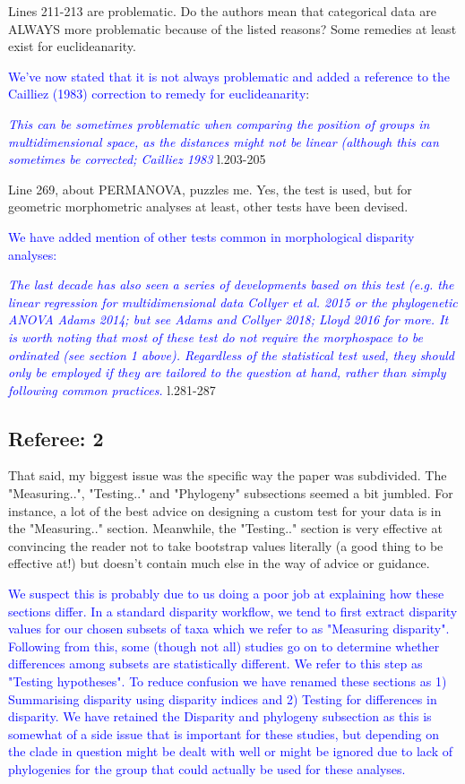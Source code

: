 \documentclass[12pt,letterpaper]{article}
\begin{document}
\noindent Lines 211-213 are problematic. Do the authors mean that categorical data are ALWAYS more problematic because of the listed reasons? Some remedies at least exist for euclideanarity.

\textcolor{blue}{We've now stated that it is not always problematic and added a reference to the Cailliez (1983) correction to remedy for euclideanarity}:

\textcolor{blue}{\textit{This can be sometimes problematic when comparing the position of groups in multidimensional space, as the distances might not be linear (although this can sometimes be corrected; Cailliez 1983}} l.203-205 %

\noindent Line 269, about PERMANOVA, puzzles me. Yes, the test is used, but for geometric morphometric analyses at least, other tests have been devised.

\textcolor{blue}{We have added mention of other tests common in morphological disparity analyses:}

\textcolor{blue}{\textit{The last decade has also seen a series of developments based on this test (e.g. the linear regression for multidimensional data  Collyer et al. 2015 or the phylogenetic ANOVA Adams 2014; but see Adams and Collyer 2018; Lloyd 2016 for more.
It is worth noting that most of these test do not require the morphospace to be ordinated (see section 1 above).
Regardless of the statistical test used, they should only be employed if they are tailored to the question at hand, rather than simply following common practices.}} l.281-287 %

\subsection{Referee: 2}

\noindent That said, my biggest issue was the specific way the paper was subdivided. The "Measuring..", "Testing.." and "Phylogeny" subsections seemed a bit jumbled. For instance, a lot of the best advice on designing a custom test for your data is in the "Measuring.." section. Meanwhile, the "Testing.." section is very effective at convincing the reader not to take bootstrap values literally (a good thing to be effective at!) but doesn't contain much else in the way of advice or guidance.

\textcolor{blue}{We suspect this is probably due to us doing a poor job at explaining how these sections differ. In a standard disparity workflow, we tend to first extract disparity values for our chosen subsets of taxa which we refer to as "Measuring disparity". Following from this, some (though not all) studies go on to determine whether differences among subsets are statistically different. We refer to this step as "Testing hypotheses". To reduce confusion we have renamed these sections as 1) Summarising disparity using disparity indices and 2) Testing for differences in disparity. We have retained the Disparity and phylogeny subsection as this is somewhat of a side issue that is important for these studies, but depending on the clade in question might be dealt with well or might be ignored due to lack of phylogenies for the group that could actually be used for these analyses.}
\end{document}
